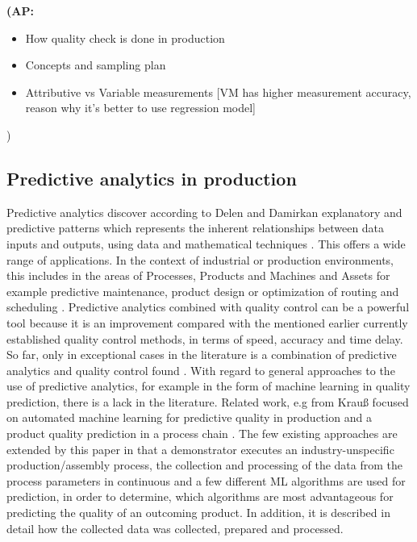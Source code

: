 \documentclass[5p,times,procedia]{elsarticle}
\newcommand{\AP}[1]{{\color{blue} {\bf (AP: #1)}}}
\begin{document}
\AP{
\begin{itemize}
\item How quality check is done in production
\item Concepts and sampling plan
\item Attributive vs Variable measurements [VM has higher measurement accuracy, reason why it’s better to use regression model]
\end{itemize}}

\subsection{Predictive analytics in production}

Predictive analytics discover according to Delen and Damirkan explanatory and predictive patterns which represents 
the inherent relationships between data inputs and outputs, using data and mathematical techniques \cite{delen2013data}. 
This offers a wide range of applications. In the context of industrial or production environments, this includes in the areas of Processes, Products and Machines and Assets for example 
predictive maintenance, product design or optimization of routing and scheduling \cite{krauss2019machine}. 
Predictive analytics combined with quality control can be a powerful tool because it is an improvement compared with the mentioned earlier currently
established quality control methods, in terms of speed, accuracy and time delay.
So far, only in exceptional cases in the literature is a combination of predictive analytics and quality control found \cite{aumi2012model, ritter1992neue}. With regard to general approaches to the use of predictive analytics,
for example in the form of machine learning in quality prediction, there is a lack in the literature. 
Related work, e.g from Krauß focused on automated machine learning for predictive quality in production \cite{krauss2020automated} and a product quality prediction in a process chain \cite{krauss2019machine}. 
The few existing approaches are extended by this paper in that a demonstrator executes an industry-unspecific production/assembly process,
the collection and processing of the data from the process parameters in continuous and a few different ML algorithms are used for prediction, 
in order to determine, which algorithms are most advantageous for predicting the quality of an outcoming product. 
In addition, it is described in detail how the collected data was collected, prepared and processed.
\end{document}
